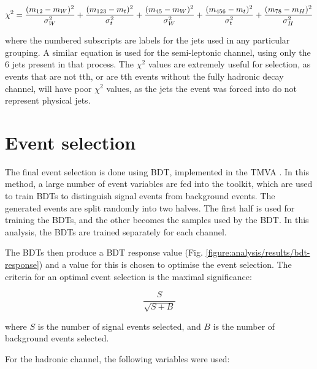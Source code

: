 \begin{equation}
  \centering
	\chi^2 = \frac{(m_{12} - m_W)^2}{\sigma^2_W} + \frac{(m_{123} - m_t)^2}{\sigma^2_{t}} + \frac{(m_{45} - m_W)^2}{\sigma^2_W} + \frac{(m_{456} - m_t)^2}{\sigma^2_{t}} + \frac{(m_{78} - m_H)^2}{\sigma^2_H}
\label{eq:chi-square}
\end{equation}

where the numbered subscripts are labels for the jets used in any particular grouping. A similar equation is used for the semi-leptonic channel, using only the 6 jets present in that process. The $\chi^2$ values are extremely useful for selection, as events that are not tth, or are tth events without the fully hadronic decay channel, will have poor $\chi^2$ values, as the jets the event was forced into do not represent physical jets.

\section{Event selection}
The final event selection is done using \acrfull{BDT}, implemented in the \acrfull{TMVA}  . In this method, a large number of event variables are fed into the toolkit, which are used to train \acrshort{BDT}s to distinguish signal events from background events. The generated events are split randomly into two halves. The first half is used for training the \acrshort{BDT}s, and the other becomes the samples used by the \acrshort{BDT}. In this analysis, the \acrshort{BDT}s are trained separately for each channel. 

The \acrshort{BDT}s then produce a \acrshort{BDT} response value (Fig. \ref{figure:analysis/results/bdt-response}) and a value for this is chosen to optimise the event selection. The criteria for an optimal event selection is the maximal significance:

\begin{equation}
	\frac{S}{\sqrt{S + B}}
\label{eq:significance}
\end{equation}

where $S$ is the number of signal events selected, and $B$ is the number of background events selected.

For the hadronic channel, the following variables were used:

